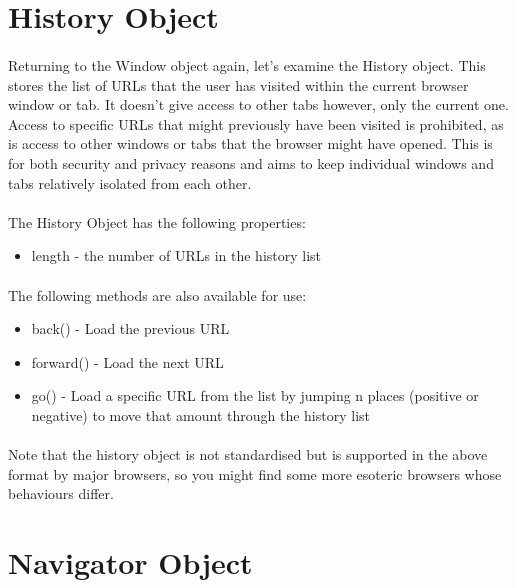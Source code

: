 \section{History Object}
\paragraph{} Returning to the Window object again, let's examine the History object. This stores the list of URLs that the user has visited within the current browser window or tab. It doesn't give access to other tabs however, only the current one. Access to specific URLs that might previously have been visited is prohibited, as is access to other windows or tabs that the browser might have opened. This is for both security and privacy reasons and aims to keep individual windows and tabs relatively isolated from each other.

\paragraph{} The History Object has the following properties:

\begin{itemize}
\item length -  the number of URLs in the history list
\end{itemize}

\paragraph{} The following methods are also available for use:

\begin{itemize}
\item back() -  Load the previous URL
\item forward() - Load the next URL
\item go() - Load a specific URL from the list by jumping n places (positive or negative) to move that amount through the history list
\end{itemize}

\paragraph{} Note that the history object is not standardised but is supported in the above format by major browsers, so you might find some more esoteric browsers whose behaviours differ.


\section{Navigator Object}

